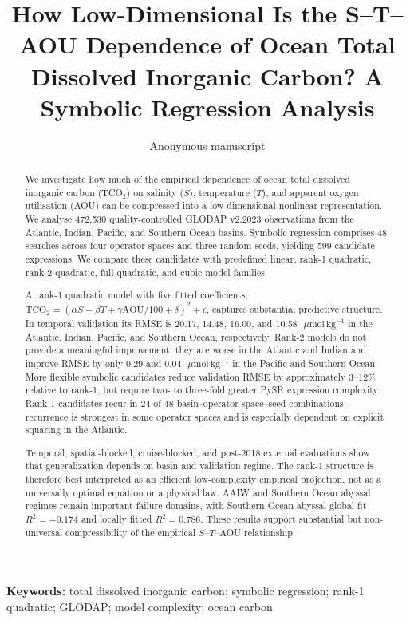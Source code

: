 \documentclass[12pt,a4paper]{article}
\title{How Low-Dimensional Is the S--T--AOU Dependence of Ocean Total Dissolved Inorganic Carbon? A Symbolic Regression Analysis}
\author{Anonymous manuscript}
\date{}
\newcommand{\tco}{\mathrm{TCO_2}}
\newcommand{\aou}{\mathrm{AOU}}
\newcommand{\umol}{\,\mu\mathrm{mol}\,\mathrm{kg}^{-1}}
\begin{document}
\maketitle

\begin{abstract}
We investigate how much of the empirical dependence of ocean total dissolved inorganic carbon (TCO$_2$) on salinity ($S$), temperature ($T$), and apparent oxygen utilisation (AOU) can be compressed into a low-dimensional nonlinear representation. We analyse 472,530 quality-controlled GLODAP v2.2023 observations from the Atlantic, Indian, Pacific, and Southern Ocean basins. Symbolic regression comprises 48 searches across four operator spaces and three random seeds, yielding 599 candidate expressions. We compare these candidates with predefined linear, rank-1 quadratic, rank-2 quadratic, full quadratic, and cubic model families.

A rank-1 quadratic model with five fitted coefficients, $\tco=(\alpha S+\beta T+\gamma\aou/100+\delta)^2+\epsilon$, captures substantial predictive structure. In temporal validation its RMSE is 20.17, 14.48, 16.00, and 10.58~$\umol$ in the Atlantic, Indian, Pacific, and Southern Ocean, respectively. Rank-2 models do not provide a meaningful improvement: they are worse in the Atlantic and Indian and improve RMSE by only 0.29 and 0.04~$\umol$ in the Pacific and Southern Ocean. More flexible symbolic candidates reduce validation RMSE by approximately 3--12\% relative to rank-1, but require two- to three-fold greater PySR expression complexity. Rank-1 candidates recur in 24 of 48 basin--operator-space--seed combinations; recurrence is strongest in some operator spaces and is especially dependent on explicit squaring in the Atlantic.

Temporal, spatial-blocked, cruise-blocked, and post-2018 external evaluations show that generalization depends on basin and validation regime. The rank-1 structure is therefore best interpreted as an efficient low-complexity empirical projection, not as a universally optimal equation or a physical law. AAIW and Southern Ocean abyssal regimes remain important failure domains, with Southern Ocean abyssal global-fit $R^2=-0.174$ and locally fitted $R^2=0.786$. These results support substantial but non-universal compressibility of the empirical $S$--$T$--AOU relationship.
\end{abstract}

\noindent\textbf{Keywords:} total dissolved inorganic carbon; symbolic regression; rank-1 quadratic; GLODAP; model complexity; ocean carbon
\end{document}
